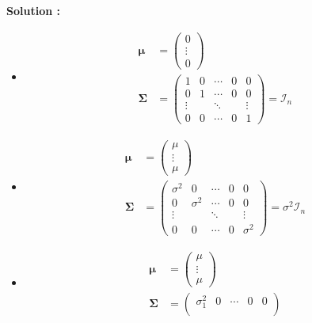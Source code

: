 \documentclass[letter, 11pt]{article}
\newcommand{\prof}[1]{\ifdefined\avecsolutions\par{\color{blue}\textbf{Solution :} #1}\par\fi}
\newcommand{\bo}[1]{\boldsymbol#1}
\begin{document}
\begin{enumerate}[leftmargin=*, wide, label=\bf Exercice \arabic*:]
\prof{
\begin{itemize}
    \item[(a)] \begin{align*}
        \bo\mu
        &= \begin{pmatrix}
            0 \\[4mm]
            \vdots \\[4mm]
            0
        \end{pmatrix}\\
        \bo\Sigma
        &= \begin{pmatrix}
            1 & 0 & \cdots & 0 & 0 \\[4mm]
            0 & 1 & \cdots & 0 & 0 \\[4mm]
            \vdots & & \ddots & & \vdots \\[4mm]
            0 & 0 & \cdots & 0 & 1
        \end{pmatrix} = \mathcal{I}_n
    \end{align*}
    \item[(b)] \begin{align*}
        \bo\mu
        &= \begin{pmatrix}
            \mu \\[4mm]
            \vdots \\[4mm]
            \mu
        \end{pmatrix}\\
        \bo\Sigma
        &=  \begin{pmatrix}
            \sigma^2 & 0 & \cdots & 0 & 0 \\[4mm]
            0 & \sigma^2 & \cdots & 0 & 0 \\[4mm]
            \vdots & & \ddots & & \vdots \\[4mm]
            0 & 0 & \cdots & 0 & \sigma^2
        \end{pmatrix} = \sigma^2\mathcal{I}_n
    \end{align*}
     \item[(c)] \begin{align*}
        \bo\mu
        &= \begin{pmatrix}
            \mu \\[4mm]
            \vdots \\[4mm]
            \mu
        \end{pmatrix}\\
        \bo\Sigma
        &=  \begin{pmatrix}
            \sigma_1^2 & 0 & \cdots & 0 & 0 \\[4mm]

\end{pmatrix}
\end{align*}
\end{itemize}}
\end{enumerate}
\end{document}

